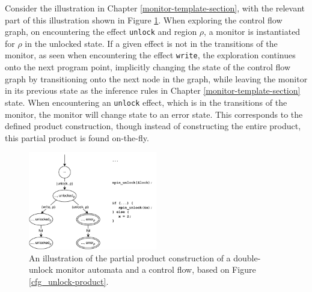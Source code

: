 \newpar Consider the illustration in Chapter \ref{monitor-template-section}, with the relevant part of this illustration shown in Figure \ref{cfg_unlock-product-partial}. When exploring the control flow graph, on encountering the effect \texttt{unlock} and region $\rho$, a monitor is instantiated for $\rho$ in the unlocked state. If a given effect is not in the transitions of the monitor, as seen when encountering the effect \texttt{write}, the exploration continues onto the next program point, implicitly changing the state of the control flow graph by transitioning onto the next node in the graph, while leaving the monitor in its previous state as the inference rules in Chapter \ref{monitor-template-section} state. When encountering an \texttt{unlock} effect, which is in the transitions of the monitor, the monitor will change state to an error state. This corresponds to the defined product construction, though instead of constructing the entire product, this partial product is found on-the-fly. 

\begin{figure}[H]
    \centering
    \includegraphics[width=0.5\textwidth]{implementation/figures/cfg_unlock-product-partial}
    \caption{An illustration of the partial product construction of a double-unlock monitor automata and a control flow, based on Figure \ref{cfg_unlock-product}.}
    \label{cfg_unlock-product-partial}
\end{figure}